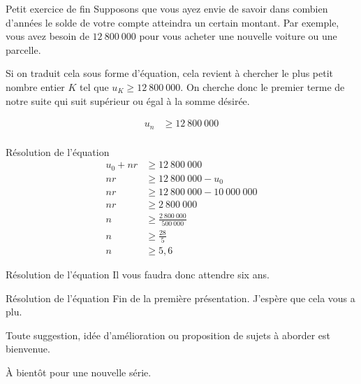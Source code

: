 \documentclass{beamer}
\begin{document}
\begin{frame}{Petit exercice de fin}
Supposons que vous ayez envie de savoir dans combien d'années le solde de votre compte atteindra un certain montant. Par exemple, vous avez besoin de $12\ 800\ 000$ pour vous acheter une nouvelle voiture ou une parcelle.

Si on traduit cela sous forme d'équation, cela revient à chercher le plus petit nombre entier $K$ tel que $u_K \ge 12\ 800\ 000$. On cherche donc le premier terme de notre suite qui suit supérieur ou égal à la somme désirée.

\begin{align*}
  u_n &\ge 12\ 800\ 000 \\
\end{align*}
\end{frame}

\begin{frame}{Résolution de l'équation}
\begin{align*}
  u_0 + nr 	&\ge 12\ 800\ 000 \\
  nr 				&\ge 12\ 800\ 000 - u_0 \\
  nr 				&\ge 12\ 800\ 000 - 10\ 000\ 000 \\
  nr 				&\ge 2\ 800\ 000 \\
  n 				&\ge \frac{2\ 800\ 000}{500\ 000} \\
  n 				&\ge \frac{28}{5} \\
  n 				&\ge 5,6
\end{align*}
\end{frame}

\begin{frame}{Résolution de l'équation}
Il vous faudra donc attendre six ans. \Smiley
\end{frame}

\begin{frame}{Résolution de l'équation}
Fin de la première présentation. J'espère que cela vous a plu.

Toute suggestion, idée d'amélioration ou proposition de sujets à aborder est bienvenue.

\`{A} bientôt pour une nouvelle série.

\begin{center}
  \dSmiley[3]
\end{center}
\end{frame}
\end{document}
